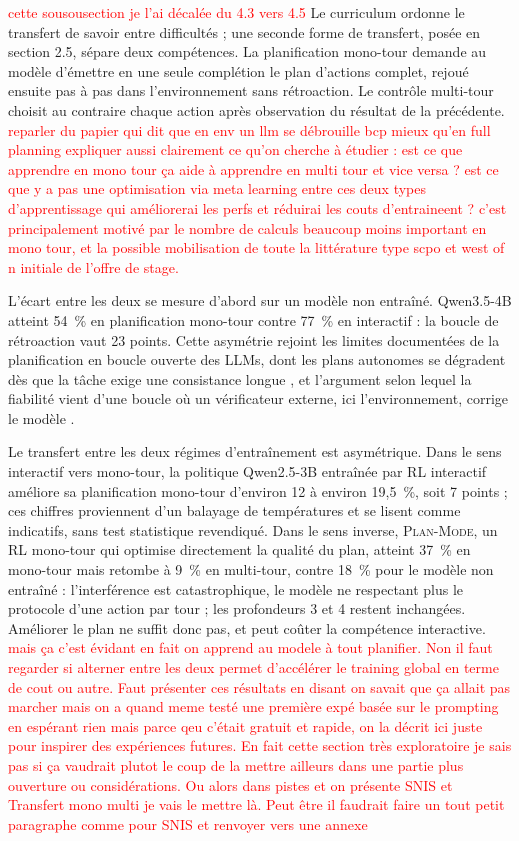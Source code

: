 \documentclass[11pt,a4paper]{article}
\begin{document}
\textcolor{red}{cette sousousection je l'ai décalée du 4.3 vers 4.5} 
Le curriculum ordonne le transfert de savoir entre difficultés ; une seconde forme de transfert, posée en section 2.5, sépare deux compétences. La planification mono-tour demande au modèle d'émettre en une seule complétion le plan d'actions complet, rejoué ensuite pas à pas dans l'environnement sans rétroaction. Le contrôle multi-tour choisit au contraire chaque action après observation du résultat de la précédente. \textcolor{red}{reparler du papier qui dit que en env un llm se débrouille bcp mieux qu'en full planning} \textcolor{red}{expliquer aussi clairement ce qu'on cherche à étudier : est ce que apprendre en mono tour ça aide à apprendre en multi tour et vice versa ? est ce que y a pas une optimisation via meta learning entre ces deux types d'apprentissage qui améliorerai les perfs et réduirai les couts d'entraineent ? c'est principalement motivé par le nombre de calculs beaucoup moins important en mono tour, et la possible mobilisation de toute la littérature type scpo et west of n initiale de l'offre de stage.} 

L'écart entre les deux se mesure d'abord sur un modèle non entraîné. Qwen3.5-4B atteint 54~\% en planification mono-tour contre 77~\% en interactif : la boucle de rétroaction vaut 23 points. Cette asymétrie rejoint les limites documentées de la planification en boucle ouverte des LLMs, dont les plans autonomes se dégradent dès que la tâche exige une consistance longue \cite{valmeekam2023planning}, et l'argument selon lequel la fiabilité vient d'une boucle où un vérificateur externe, ici l'environnement, corrige le modèle \cite{kambhampati2024llmmodulo}.

Le transfert entre les deux régimes d'entraînement est asymétrique. Dans le sens interactif vers mono-tour, la politique Qwen2.5-3B entraînée par RL interactif améliore sa planification mono-tour d'environ 12 à environ 19{,}5~\%, soit 7 points ; ces chiffres proviennent d'un balayage de températures et se lisent comme indicatifs, sans test statistique revendiqué. Dans le sens inverse, \textsc{Plan-Mode}, un RL mono-tour qui optimise directement la qualité du plan, atteint 37~\% en mono-tour mais retombe à 9~\% en multi-tour, contre 18~\% pour le modèle non entraîné : l'interférence est catastrophique, le modèle ne respectant plus le protocole d'une action par tour ; les profondeurs 3 et 4 restent inchangées. Améliorer le plan ne suffit donc pas, et peut coûter la compétence interactive. \textcolor{red}{mais ça c'est évidant en fait on apprend au modele à tout planifier. Non il faut regarder si alterner entre les deux permet d'accélérer le training global en terme de cout ou autre. Faut présenter ces résultats en disant on savait que ça allait pas marcher mais on a quand meme testé une première expé basée sur le prompting en espérant rien mais parce qeu c'était gratuit et rapide, on la décrit ici juste pour inspirer des expériences futures. En fait cette section très exploratoire je sais pas si ça vaudrait plutot le coup de la mettre ailleurs dans une partie plus ouverture ou considérations. Ou alors dans pistes et on présente SNIS et Transfert mono multi je vais le mettre là. Peut être il faudrait faire un tout petit paragraphe comme pour SNIS et renvoyer vers une annexe} 
\end{document}
